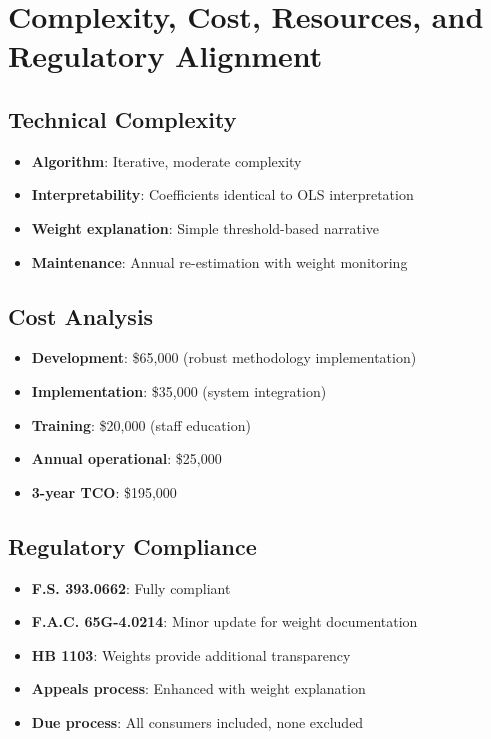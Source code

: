 \section{Complexity, Cost, Resources, and Regulatory Alignment}

\subsection{Technical Complexity}

\begin{itemize}
    \item \textbf{Algorithm}: Iterative, moderate complexity
    \item \textbf{Interpretability}: Coefficients identical to OLS interpretation
    \item \textbf{Weight explanation}: Simple threshold-based narrative
    \item \textbf{Maintenance}: Annual re-estimation with weight monitoring
\end{itemize}

\subsection{Cost Analysis}

\begin{itemize}
    \item \textbf{Development}: \$65,000 (robust methodology implementation)
    \item \textbf{Implementation}: \$35,000 (system integration)
    \item \textbf{Training}: \$20,000 (staff education)
    \item \textbf{Annual operational}: \$25,000
    \item \textbf{3-year TCO}: \$195,000
\end{itemize}

\subsection{Regulatory Compliance}

\begin{itemize}
    \item[\greencheck] \textbf{F.S. 393.0662}:  Fully compliant
    \item[\yellowwarning] \textbf{F.A.C. 65G-4.0214}:  Minor update for weight documentation
    \item[\greencheck] \textbf{HB 1103}:  Weights provide additional transparency
    \item[\greencheck] \textbf{Appeals process}: Enhanced with weight explanation
    \item[\greencheck] \textbf{Due process}: All consumers included, none excluded
\end{itemize}

